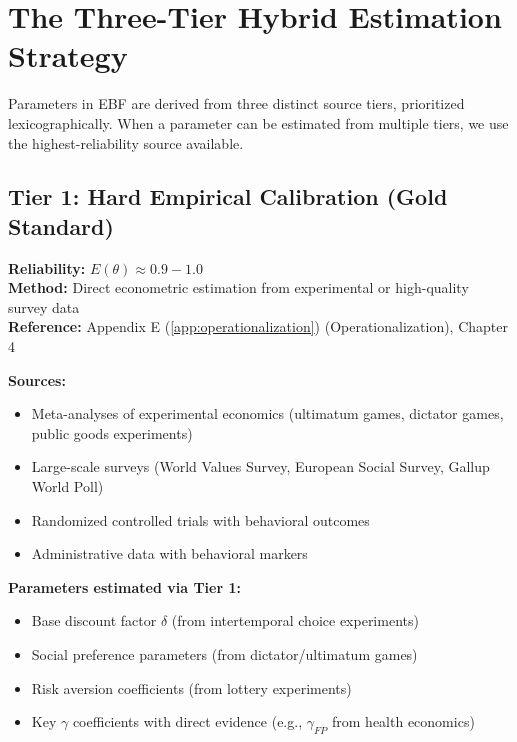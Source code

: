 \documentclass[11pt,a4paper]{article}
\theoremstyle{definition}
\begin{document}

\section{The Three-Tier Hybrid Estimation Strategy}
\label{sec:bbb-three-tier}

Parameters in EBF are derived from three distinct source tiers, 
prioritized lexicographically. When a parameter can be estimated from 
multiple tiers, we use the highest-reliability source available.

\subsection{Tier 1: Hard Empirical Calibration (Gold Standard)}

\begin{tcolorbox}[colback=green!5!white, colframe=green!75!black]
\textbf{Reliability:} $E(\theta) \approx 0.9 - 1.0$ \\
\textbf{Method:} Direct econometric estimation from experimental or high-quality survey data \\
\textbf{Reference:} Appendix E (\ref{app:operationalization}) (Operationalization), Chapter 4
\end{tcolorbox}

\textbf{Sources:}
\begin{itemize}
    \item Meta-analyses of experimental economics (ultimatum games, dictator games, 
    public goods experiments)
    \item Large-scale surveys (World Values Survey, European Social Survey, 
    Gallup World Poll)
    \item Randomized controlled trials with behavioral outcomes
    \item Administrative data with behavioral markers
\end{itemize}

\textbf{Parameters estimated via Tier 1:}
\begin{itemize}
    \item Base discount factor $\delta$ (from intertemporal choice experiments)
    \item Social preference parameters (from dictator/ultimatum games)
    \item Risk aversion coefficients (from lottery experiments)
    \item Key $\gamma$ coefficients with direct evidence (e.g., $\gamma_{FP}$ from 
    health economics)
\end{itemize}
\end{document}
